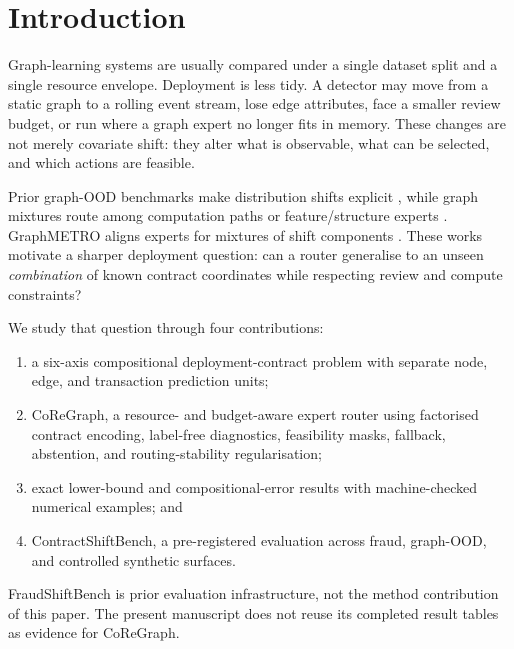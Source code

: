 \section{Introduction}

Graph-learning systems are usually compared under a single dataset split and a
single resource envelope. Deployment is less tidy. A detector may move from a
static graph to a rolling event stream, lose edge attributes, face a smaller
review budget, or run where a graph expert no longer fits in memory. These
changes are not merely covariate shift: they alter what is observable, what can
be selected, and which actions are feasible.

Prior graph-OOD benchmarks make distribution shifts explicit
\cite{gui2022good}, while graph mixtures route among computation paths or
feature/structure experts \cite{wang2023gmoe,zeng2024mowst}. GraphMETRO aligns
experts for mixtures of shift components \cite{wu2024graphmetro}. These works
motivate a sharper deployment question: can a router generalise to an unseen
\emph{combination} of known contract coordinates while respecting review and
compute constraints?

We study that question through four contributions:

\begin{enumerate}
  \item a six-axis compositional deployment-contract problem with separate
  node, edge, and transaction prediction units;
  \item CoReGraph, a resource- and budget-aware expert router using factorised
  contract encoding, label-free diagnostics, feasibility masks, fallback,
  abstention, and routing-stability regularisation;
  \item exact lower-bound and compositional-error results with machine-checked
  numerical examples; and
  \item ContractShiftBench, a pre-registered evaluation across fraud,
  graph-OOD, and controlled synthetic surfaces.
\end{enumerate}

FraudShiftBench is prior evaluation infrastructure, not the method contribution
of this paper. The present manuscript does not reuse its completed result
tables as evidence for CoReGraph.
